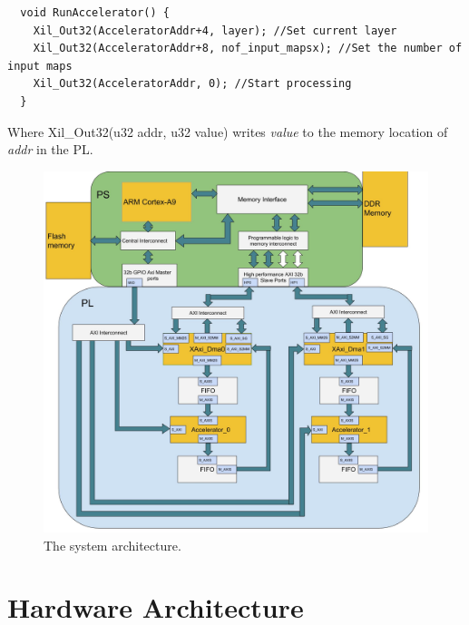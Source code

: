 \begin{lstlisting}
  void RunAccelerator() {
  	Xil_Out32(AcceleratorAddr+4, layer); //Set current layer
	Xil_Out32(AcceleratorAddr+8, nof_input_mapsx); //Set the number of input maps
	Xil_Out32(AcceleratorAddr, 0); //Start processing
  }
\end{lstlisting}

Where Xil\_Out32(u32 addr, u32 value) writes \textit{value} to the memory location of \textit{addr} in the PL. 



 


\begin{figure}[h!]
  \centering
      \includegraphics[width=1.0\textwidth]{Figures/Method/system_architecture}
    \caption{The system architecture.}
    \label{fig_system_architecture}
\end{figure}

\section{Hardware Architecture}

